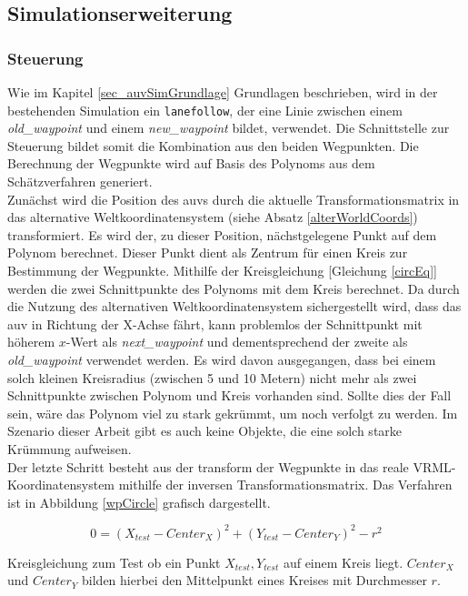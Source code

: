 \subsection{Simulationserweiterung}
\subsubsection{Steuerung}
\label{sec_waypoint}
Wie im Kapitel \ref{sec_auvSimGrundlage} Grundlagen beschrieben, wird in der bestehenden Simulation ein \texttt{\gls{lanefollow}}, der eine Linie zwischen einem \textit{old\_waypoint} und einem \textit{new\_waypoint} bildet, verwendet.
Die Schnittstelle zur Steuerung bildet somit die Kombination aus den beiden Wegpunkten. Die Berechnung der Wegpunkte wird auf Basis des Polynoms aus dem Schätzverfahren generiert.\\
Zunächst wird die Position des \gls{auv}s durch die aktuelle Transformationsmatrix in das alternative Weltkoordinatensystem (siehe Absatz \ref{alterWorldCoords}) transformiert. Es wird der, zu dieser Position, nächstgelegene Punkt auf dem Polynom berechnet. Dieser Punkt dient als Zentrum für einen Kreis zur Bestimmung der Wegpunkte. Mithilfe der Kreisgleichung [Gleichung \ref{circEq}] werden die zwei Schnittpunkte des Polynoms mit dem Kreis berechnet. Da durch die Nutzung des alternativen Weltkoordinatensystem sichergestellt wird, dass das \gls{auv} in Richtung der X-Achse fährt, kann problemlos der Schnittpunkt mit höherem $x$-Wert als \textit{next\_waypoint} und dementsprechend der zweite als \textit{old\_waypoint} verwendet werden. Es wird davon ausgegangen, dass bei einem solch kleinen Kreisradius (zwischen 5 und 10 Metern) nicht mehr als zwei Schnittpunkte zwischen Polynom und Kreis vorhanden sind. Sollte dies der Fall sein, wäre das Polynom viel zu stark gekrümmt, um noch verfolgt zu werden. Im Szenario dieser Arbeit gibt es auch keine Objekte, die eine solch starke Krümmung aufweisen.\\
Der letzte Schritt besteht aus der \gls{transform} der Wegpunkte in das reale VRML-Koordinatensystem mithilfe der inversen Transformationsmatrix.
Das Verfahren ist in Abbildung \ref{wpCircle} grafisch dargestellt.

\begin{ownequation}[H]
\begin{equation}
0 = (X_{test}-Center_X)^2+(Y_{test}-Center_Y)^2 - r^2
\end{equation}
\caption[Kreisgleichung zum Test, ob ein Punkt auf einem Kreis liegt.]{Kreisgleichung zum Test ob ein Punkt $X_{test},Y_{test}$ auf einem Kreis liegt. $Center_X$ und $Center_Y$ bilden hierbei den Mittelpunkt eines Kreises mit Durchmesser $r$.}
\label{circEq}
\end{ownequation}

